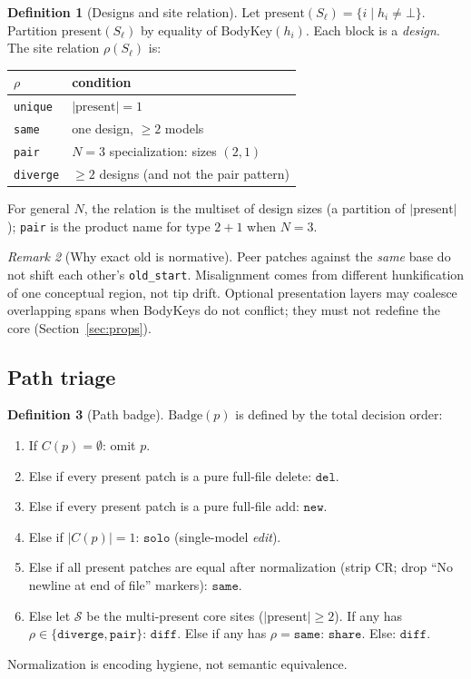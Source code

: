 \documentclass[
  11pt,
  a4paper,
  oneside,
  numbers=noenddot,
  abstract=true,
  headings=normal,
  DIV=11,
  BCOR=0mm,
]{scrartcl}
\theoremstyle{definition}
\newtheorem{definition}{Definition}[section]
\theoremstyle{plain}
\theoremstyle{remark}
\newtheorem{remark}[definition]{Remark}
\newcommand{\badge}[1]{\texttt{#1}}
\newcommand{\BodyKey}{\mathrm{BodyKey}}
\newcommand{\Badge}{\mathrm{Badge}}
\begin{document}
\begin{definition}[Designs and site relation]
\label{def:design}
Let $\mathrm{present}(S_\ell)=\{i\mid h_i\neq\bot\}$. Partition
$\mathrm{present}(S_\ell)$ by equality of $\BodyKey(h_i)$. Each block is a
\emph{design}. The site relation $\rho(S_\ell)$ is:
\begin{center}
\begin{tabular}{@{}ll@{}}
\toprule
$\rho$ & condition \\
\midrule
\texttt{unique} & $|\mathrm{present}|=1$ \\
\texttt{same} & one design, $\ge 2$ models \\
\texttt{pair} & $N=3$ specialization: sizes $(2,1)$ \\
\texttt{diverge} & $\ge 2$ designs (and not the pair pattern) \\
\bottomrule
\end{tabular}
\end{center}
For general $N$, the relation is the multiset of design sizes (a partition
of $|\mathrm{present}|$); \texttt{pair} is the product name for type
$2{+}1$ when $N=3$.
\end{definition}

\begin{remark}[Why exact $\mathrm{old}$ is normative]
Peer patches against the \emph{same} base do not shift each other's
\texttt{old\_start}. Misalignment comes from different hunkification of
one conceptual region, not tip drift. Optional presentation layers may
coalesce overlapping spans when BodyKeys do not conflict; they must not
redefine the core (Section~\ref{sec:props}).
\end{remark}

\subsection{Path triage}

\begin{definition}[Path badge]
\label{def:badge}
$\Badge(p)$ is defined by the total decision order:
\begin{enumerate}
  \item If $C(p)=\emptyset$: omit $p$.
  \item Else if every present patch is a pure full-file delete: $\badge{del}$.
  \item Else if every present patch is a pure full-file add: $\badge{new}$.
  \item Else if $|C(p)|=1$: $\badge{solo}$ (single-model \emph{edit}).
  \item Else if all present patches are equal after normalization
        (strip CR; drop ``No newline at end of file'' markers): $\badge{same}$.
  \item Else let $\mathcal{S}$ be the multi-present core sites
        ($|\mathrm{present}|\ge 2$). If any has $\rho\in\{\texttt{diverge},\texttt{pair}\}$:
        $\badge{diff}$. Else if any has $\rho=\texttt{same}$: $\badge{share}$.
        Else: $\badge{diff}$.
\end{enumerate}
Normalization is encoding hygiene, not semantic equivalence.
\end{definition}
\end{document}
